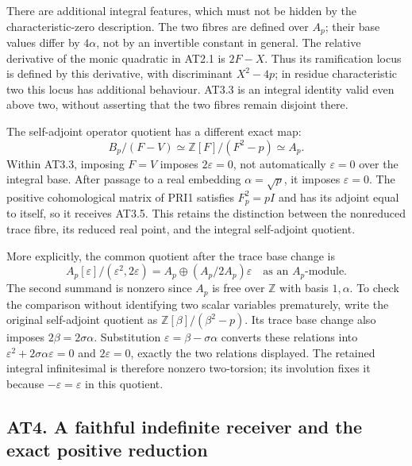 \documentclass[
]{article}
\begin{document}
There are additional integral features, which must not be hidden by the
characteristic-zero description. The two fibres are defined over
\(A_p\); their base values differ by \(4\alpha\), not by an invertible
constant in general. The relative derivative of the monic quadratic in
AT2.1 is \(2F-X\). Thus its ramification locus is defined by this
derivative, with discriminant \(X^2-4p\); in residue characteristic two
this locus has additional behaviour. AT3.3 is an integral identity valid
even above two, without asserting that the two fibres remain disjoint
there.

The self-adjoint operator quotient has a different exact map: \[
B_p/(F-V)\simeq\mathbb Z[F]/(F^2-p)\simeq A_p.
\tag{AT3.5}
\] Within AT3.3, imposing \(F=V\) imposes \(2\varepsilon=0\), not
automatically \(\varepsilon=0\) over the integral base. After passage to
a real embedding \(\alpha=\sqrt p\), it imposes \(\varepsilon=0\). The
positive cohomological matrix of PRI1 satisfies \(F_p^2=pI\) and has its
adjoint equal to itself, so it receives AT3.5. This retains the
distinction between the nonreduced trace fibre, its reduced real point,
and the integral self-adjoint quotient.

More explicitly, the common quotient after the trace base change is \[
A_p[\varepsilon]/(\varepsilon^2,2\varepsilon)
=A_p\oplus(A_p/2A_p)\varepsilon
\quad\text{as an }A_p\text{-module}.
\tag{AT3.6}
\] The second summand is nonzero since \(A_p\) is free over
\(\mathbb Z\) with basis \(1,\alpha\). To check the comparison without
identifying two scalar variables prematurely, write the original
self-adjoint quotient as \(\mathbb Z[\beta]/(\beta^2-p)\). Its trace
base change also imposes \(2\beta=2\sigma\alpha\). Substitution
\(\varepsilon=\beta-\sigma\alpha\) converts these relations into
\(\varepsilon^2+2\sigma\alpha\varepsilon=0\) and \(2\varepsilon=0\),
exactly the two relations displayed. The retained integral infinitesimal
is therefore nonzero two-torsion; its involution fixes it because
\(-\varepsilon=\varepsilon\) in this quotient.

\subsection{AT4. A faithful indefinite receiver and the exact positive
reduction}\label{at4.-a-faithful-indefinite-receiver-and-the-exact-positive-reduction}
\end{document}
